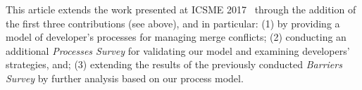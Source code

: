This article extends the work presented at ICSME 2017~\cite{mckee2017software} through the addition of the first three contributions (see above), and in particular:
(1) by providing a model of developer's processes for managing merge conflicts; 
(2) conducting an additional \emph{Processes Survey} for validating our model and examining developers' strategies, and; 
(3) extending the results of the previously conducted \emph{Barriers Survey} by further analysis based on our process model.